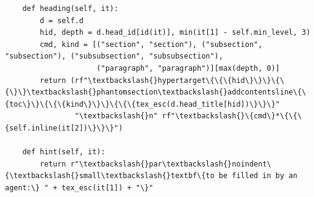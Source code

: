 \documentclass[10pt,a4paper]{article}
\begin{document}
\begin{Verbatim}
    def heading(self, it):
        d = self.d
        hid, depth = d.head_id[id(it)], min(it[1] - self.min_level, 3)
        cmd, kind = [("section", "section"), ("subsection", "subsection"), ("subsubsection", "subsubsection"),
                     ("paragraph", "paragraph")][max(depth, 0)]
        return (rf"\textbackslash{}hypertarget\{\{\{hid\}\}\}\{\{\}\}\textbackslash{}phantomsection\textbackslash{}addcontentsline\{\{toc\}\}\{\{\{kind\}\}\}\{\{\{tex_esc(d.head_title[hid])\}\}\}"
                "\textbackslash{}n" rf"\textbackslash{}\{cmd\}*\{\{\{self.inline(it[2])\}\}\}")

    def hint(self, it):
        return r"\textbackslash{}par\textbackslash{}noindent\{\textbackslash{}small\textbackslash{}textbf\{to be filled in by an agent:\} " + tex_esc(it[1]) + "\}"
\end{Verbatim}
\end{document}
